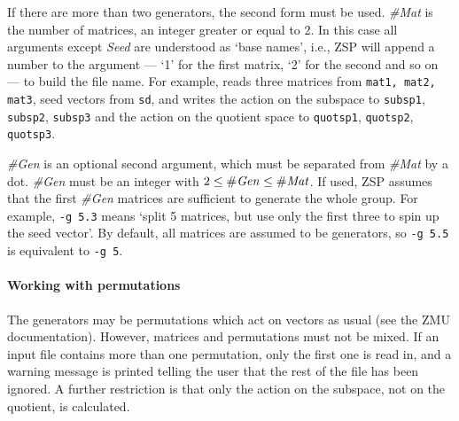 If there are more than two generators, the second form must be used.
{\it \#Mat} is the number of matrices, an integer greater or equal to
2. In this case all arguments except {\it Seed} are understood as
`base names', i.e., ZSP will append a number to the argument
--- `1' for the first matrix, `2' for the second and so on --- to
build the file name. For example,
reads three matrices from {\tt mat1, mat2, mat3}, seed vectors from
{\tt sd}, and writes the action on the subspace to {\tt subsp1},
{\tt subsp2}, {\tt subsp3} and the action on the quotient space to
{\tt quotsp1}, {\tt quotsp2}, {\tt quotsp3}.

{\it \#Gen} is an optional second argument, which must be separated
from {\it \#Mat} by a dot. {\it \#Gen} must be an integer with
$2\leq{\it \#Gen}\leq{\it \#Mat}$. If used, ZSP assumes that
the first {\it \#Gen} matrices are sufficient to generate the whole
group. For example, {\tt -g 5.3} means `split 5 matrices, but use
only the first three to spin up the seed vector'. By default, all
matrices are assumed to be generators, so {\tt -g 5.5} is equivalent
to {\tt -g 5}.

\paragraph{Working with permutations}
The generators may be permutations which act on vectors as usual 
(see the ZMU documentation). However, matrices and permutations
must not be mixed. If an input file contains more than one
permutation, only the first one is read in, and a warning message is
printed telling the user that the rest of the file has been ignored.
A further restriction is that only the action on the subspace, not
on the quotient, is calculated.



